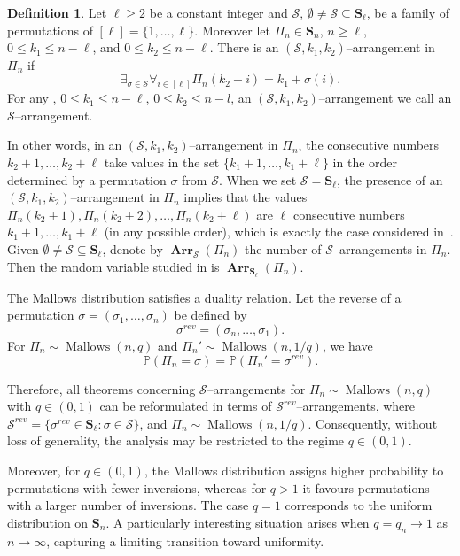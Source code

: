 \documentclass[letterpaper,11pt]{article}
\theoremstyle{definition}
\newtheorem{definition}[theorem]{Definition}
\theoremstyle{remark}
\renewcommand{\le}{\leqslant}
\renewcommand{\ge}{\geqslant}
\DeclareMathOperator{\Mallow}{Mallows}
\newcommand{\bS}{\mathbf{S}}
\newcommand{\Arr}{\ensuremath{\operatorname{\mathbf{Arr}}}}
\newcommand{\Pra}[1]{\mathbb{P}\left(#1\right)}
\newcommand{\cS}{\mathcal{S}}
\begin{document}
\begin{definition}\label{Def:Sarr}
	Let $\ell\ge 2$  be a constant integer and $\cS$, $\emptyset\neq\cS\subseteq \bS_\ell$, be a family of permutations of $[\ell]=\{1,\ldots,\ell\}$. 
	Moreover let $\varPi_n\in \bS_n$, $n\ge \ell$, $0\le k_1\le n-\ell$, and $0\le k_2\le n-\ell$. There is  an $(\cS,k_1,k_2)$--arrangement in  $\varPi_n$ if
	\[
	\exists_{\sigma\in \cS}\forall_{i\in [\ell]}\varPi_n(k_2+i)=k_1+\sigma(i).\]
	For any , $0\le k_1\le n-\ell$, $0\le k_2\le n-l$, an $(\cS,k_1,k_2)$--arrangement we call an $\cS$--arrangement.    	
\end{definition}
In other words, in an $(\cS,k_1,k_2)$--arrangement in $\varPi_n$, the consecutive numbers $k_2+1, \ldots, k_2+\ell$ take values in the set $\{k_1+1,\ldots,k_1+\ell\}$ in the order determined by a permutation $\sigma$ from $\cS$.
When we set $\cS=\bS_\ell$, the presence of an $(\cS,k_1,k_2)$--arrangement in $\varPi_n$ implies that the values $\varPi_n(k_2+1), \varPi_n(k_2+2),\ldots,\varPi_n(k_2+\ell)$ are $\ell$ consecutive numbers $k_1+1,\ldots,k_1+\ell$ (in any possible order), which is exactly the case considered in~\cite{Pinsky2022}.
Given $\emptyset\neq\cS\subseteq \bS_\ell$, denote by $\Arr_{\cS}(\varPi_n)$ the number of $\cS$--arrangements in $\varPi_n$. Then the random variable studied in \cite{Pinsky2022} is $\Arr_{\bS_\ell}(\varPi_n)$.

The Mallows distribution satisfies a duality relation. Let the reverse of a permutation $\sigma=(\sigma_1,\ldots,\sigma_n)$ be defined by
\[\sigma^{rev}=(\sigma_n,\ldots,\sigma_1).\]
For $\varPi_n\sim \Mallow(n,q)$ and $\varPi_n'\sim \Mallow(n,1/q)$, we have
\[\Pra{\varPi_n=\sigma}=\Pra{\varPi_n'=\sigma^{rev}}.\]

Therefore, all theorems concerning $\cS$--arrangements for $\varPi_n \sim \Mallow(n,q)$ with $q \in (0,1)$ can be reformulated in terms of $\cS^{rev}$--arrangements, where $\cS^{rev} = \{\sigma^{rev} \in \bS_{\ell} : \sigma \in \cS\}$, and $\varPi_n \sim \Mallow(n,1/q)$. Consequently, without loss of generality, the analysis may be restricted to the regime $q \in (0,1)$.

Moreover, for $q\in (0,1)$, the Mallows distribution assigns higher probability to permutations with fewer inversions, whereas for $q>1$ it favours permutations with a larger number of inversions. The case $q=1$ corresponds to the uniform distribution on $\bS_n$. A particularly interesting situation arises when $q = q_n \to 1$ as $n \to \infty$, capturing a limiting transition toward uniformity.
\end{document}
